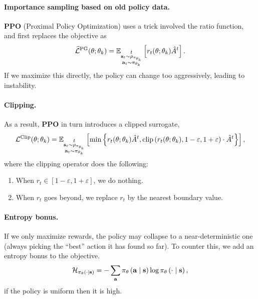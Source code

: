 \documentclass[11pt]{article}  %
\begin{document}
\paragraph{Importance sampling based on old policy data.} \textbf{PPO} (Proximal Policy Optimization) uses a trick involved the ratio function, and first replaces the objective as 
\begin{align*}
  \widehat{\mathcal{L}}^{\text{PG}}(\theta; \theta_k) = \mathbb{E}_{ \substack{t \\ \mathbf{s}_t \sim \rho_{\pi_{\theta_k}} \\ \mathbf{a}_t \sim \pi_{\theta_k}}}\left[r_t(\theta; \theta_k) \hat{A}^t\right].
\end{align*} 
If we maximize this directly, the policy can change too aggressively, leading to instability.

\paragraph{Clipping.} As a result, \textbf{PPO} in turn introduces a clipped surrogate,
\begin{align*}
  \mathcal{L}^{\text{Clip}}(\theta; \theta_k) = \mathbb{E}_{\substack{t \\ \mathbf{s}_t \sim \rho_{\pi_{\theta_k}} \\ \mathbf{a}_t \sim \pi_{\theta_k}}}\left[\min\left\{ r_t(\theta; \theta_k) \hat{A}^t, \text{clip}\left( r_t(\theta; \theta_k), 1-\varepsilon, 1+\varepsilon \right)\cdot\hat{A}^t \right\}\right],
\end{align*}
where the clipping operator does the following:
\begin{enumerate}
  \item When $r_t \in [1 - \varepsilon, 1 + \varepsilon]$, we do nothing.
  \item When $r_t$ goes beyond, we replace $r_t$ by the nearest boundary value.
\end{enumerate}

\paragraph{Entropy bonus.}
If we only maximize rewards, the policy may collapse to a near-deterministic one (always picking the “best” action it has found so far).
To counter this, we add an entropy bonus to the objective.
\begin{align*}
  \mathcal{H}_{\pi_{\theta}\left( \cdot \mid \mathbf{s} \right)} = -\sum_{\mathbf{a}} \pi_{\theta}\left( \mathbf{a} \mid \mathbf{s} \right) \log \pi_{\theta}\left( \cdot \mid \mathbf{s} \right),
\end{align*}
if the policy is uniform then it is high.
\end{document}
